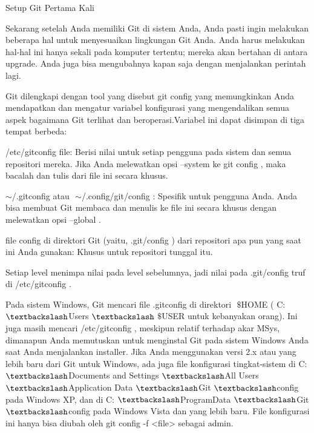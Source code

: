 \vspace{12pt}
\noindent 
Setup Git Pertama Kali \par
\vspace{12pt}
\noindent 
Sekarang setelah Anda memiliki Git di sistem Anda, Anda pasti ingin melakukan beberapa hal untuk menyesuaikan lingkungan Git Anda. $  $Anda harus melakukan hal-hal ini hanya sekali pada komputer tertentu; $  $mereka akan bertahan di antara upgrade. $  $Anda juga bisa mengubahnya kapan saja dengan menjalankan perintah lagi. \par
\vspace{12pt}
\noindent 
Git dilengkapi dengan tool yang disebut $  $git config $  $yang memungkinkan Anda mendapatkan dan mengatur variabel konfigurasi yang mengendalikan semua aspek bagaimana Git terlihat dan beroperasi.Variabel ini dapat disimpan di tiga tempat berbeda: \par
\vspace{12pt}
\noindent 
/etc/gitconfig $  $file: Berisi nilai untuk setiap pengguna pada sistem dan semua repositori mereka. $  $Jika Anda melewatkan opsi $  $--system $  $ke $  $git config $  $, maka bacalah dan tulis dari file ini secara khusus. \par
\vspace{12pt}
\noindent 
 $  \sim  $/.gitconfig $  $atau $  $ $  \sim  $/.config/git/config $  $: Spesifik untuk pengguna Anda. $  $Anda bisa membuat Git membaca dan menulis ke file ini secara khusus dengan melewatkan opsi $  $--global $  $. \par
\vspace{12pt}
\noindent 
file $  $config $  $di direktori Git (yaitu, $  $.git/config $  $) dari repositori apa pun yang saat ini Anda gunakan: Khusus untuk repositori tunggal itu. \par
\vspace{12pt}
\noindent 
Setiap level menimpa nilai pada level sebelumnya, jadi nilai pada $  $.git/config $  $truf di $  $/etc/gitconfig $  $. \par
\noindent 
Pada sistem Windows, Git mencari file $  $.gitconfig $  $di direktori $  $ $  \$  $HOME $  $( $  $C: $  \textbackslash  $Users $  \textbackslash  $ $  \$  $USER $  $untuk kebanyakan orang). $  $Ini juga masih mencari $  $/etc/gitconfig $  $, meskipun relatif terhadap akar MSys, dimanapun Anda memutuskan untuk menginstal Git pada sistem Windows Anda saat Anda menjalankan installer. $  $Jika Anda menggunakan versi 2.x atau yang lebih baru dari Git untuk Windows, ada juga file konfigurasi tingkat-sistem di $  $C: $  \textbackslash  $Documents and Settings $  \textbackslash  $All Users $  \textbackslash  $Application Data $  \textbackslash  $Git $  \textbackslash  $config $  $pada Windows XP, dan di $  $C: $  \textbackslash  $ProgramData $  \textbackslash  $Git $  \textbackslash  $config $  $pada Windows Vista dan yang lebih baru. $  $File konfigurasi ini hanya bisa diubah oleh $  $git config -f <file> $  $sebagai admin. \par

